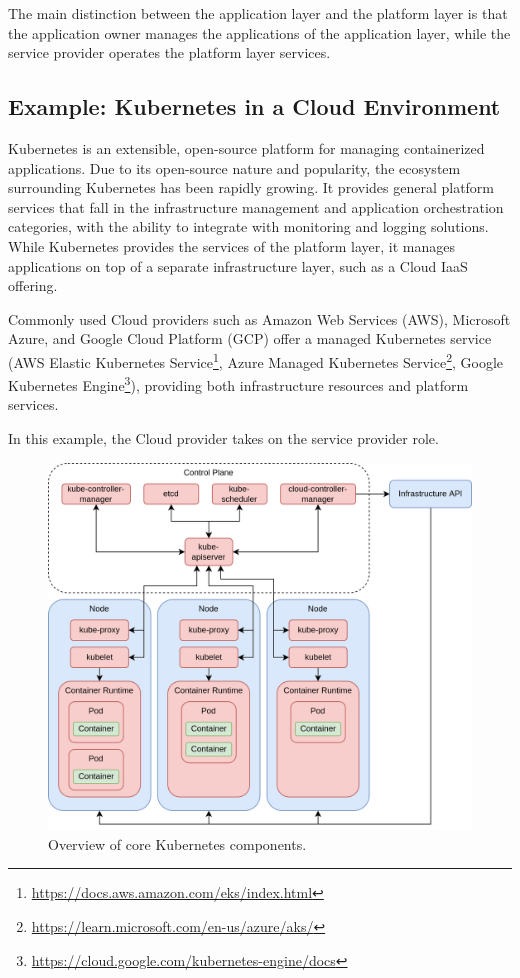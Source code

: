 The main distinction between the application layer and the platform layer is
that the application owner manages the applications of the application layer,
while the service provider operates the platform layer services.

\subsection{Example: Kubernetes in a Cloud Environment}
\label{sec:example-kubernetes}

Kubernetes is an extensible, open-source platform for managing containerized
applications. Due to its open-source nature and popularity, the ecosystem
surrounding Kubernetes has been rapidly growing. It provides general platform
services that fall in the infrastructure management and application
orchestration categories, with the ability to integrate with monitoring and
logging solutions. While Kubernetes provides the services of the platform layer,
it manages applications on top of a separate infrastructure layer, such as a
Cloud IaaS offering.

Commonly used Cloud providers such as Amazon Web Services (AWS), Microsoft
Azure, and Google Cloud Platform (GCP) offer a managed Kubernetes service (AWS
Elastic Kubernetes
Service\footnote{\url{https://docs.aws.amazon.com/eks/index.html}}, Azure
Managed Kubernetes
Service\footnote{\url{https://learn.microsoft.com/en-us/azure/aks/}}, Google
Kubernetes
Engine\footnote{\url{https://cloud.google.com/kubernetes-engine/docs}}),
providing both infrastructure resources and platform services.

In this example, the Cloud provider takes on the service provider role.

\begin{figure}[H]
  \centering
  \includegraphics[width=0.8\linewidth]{resources/kubernetes-overview.drawio.png}
  \caption{Overview of core Kubernetes components.}
  \label{fig:kubernetes-overview}
\end{figure}

